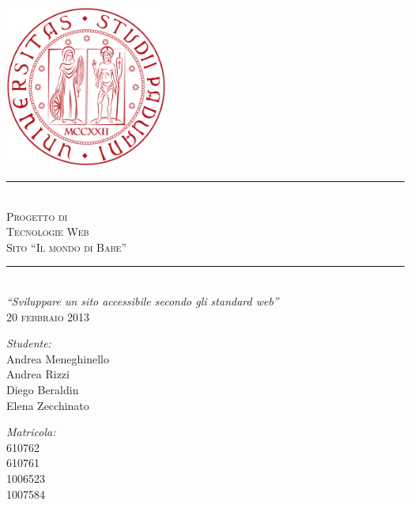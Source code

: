 \documentclass[10pt,a4paper,onecolumn]{article}
\begin{document}
\begin{titlepage}

\begin{center}
 
\textsc{\Large}\\[5cm]

\includegraphics[width=0.4\textwidth]{Logo.png}\\[0.3cm]  
\noindent\rule{\textwidth}{0.4pt} \\[0.3cm]
\textsc{\Huge Progetto di}\\[0.25cm]
\textsc{\Huge Tecnologie Web}\\[0.3cm]
\textsc{\Large Sito ``Il mondo di Babe''}
\noindent\rule{\textwidth}{0.4pt}\\[0.5cm]
\textit{``Sviluppare un sito accessibile secondo gli standard web''} \\[0.5cm]
\textsc{20 febbraio 2013}\\[0.5cm]
\begin{minipage}{0.4\textwidth}
\begin{flushleft} \large
\emph{Studente:}\\
Andrea Meneghinello\\
Andrea Rizzi\\
Diego Beraldin\\
Elena Zecchinato
\end{flushleft}
\end{minipage}
\begin{minipage}{0.4\textwidth}
\begin{flushright} \large
\emph{Matricola:} \\
610762\\
610761\\
1006523\\
1007584\\
\end{flushright}
\end{minipage}
\end{center}
\end{titlepage}
\end{document}
